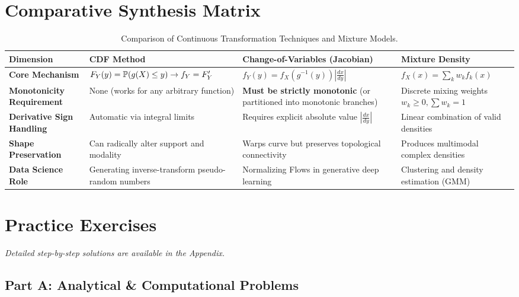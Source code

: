 \section{Comparative Synthesis Matrix}

\begin{table}[htbp]
\centering
\small
\begin{tabular}{p{3.2cm}p{3.8cm}p{3.8cm}p{3.5cm}}
\toprule
\textbf{Dimension} & \textbf{CDF Method} & \textbf{Change-of-Variables (Jacobian)} & \textbf{Mixture Density} \\
\midrule
\textbf{Core Mechanism} & $F_Y(y) = \P(g(X) \le y) \to f_Y = F_Y'$ & $f_Y(y) = f_X(g^{-1}(y)) \left|\frac{dx}{dy}\right|$ & $f_X(x) = \sum_k w_k f_k(x)$ \\
\addlinespace
\textbf{Monotonicity Requirement} & None (works for any arbitrary function) & \textbf{Must be strictly monotonic} (or partitioned into monotonic branches) & Discrete mixing weights $w_k \ge 0, \sum w_k = 1$ \\
\addlinespace
\textbf{Derivative Sign Handling} & Automatic via integral limits & Requires explicit absolute value $\left|\frac{dx}{dy}\right|$ & Linear combination of valid densities \\
\addlinespace
\textbf{Shape Preservation} & Can radically alter support and modality & Warps curve but preserves topological connectivity & Produces multimodal complex densities \\
\addlinespace
\textbf{Data Science Role} & Generating inverse-transform pseudo-random numbers & Normalizing Flows in generative deep learning & Clustering and density estimation (GMM) \\
\bottomrule
\end{tabular}
\caption{Comparison of Continuous Transformation Techniques and Mixture Models.}
\end{table}

\newpage
\section{Practice Exercises}
\textit{Detailed step-by-step solutions are available in the Appendix.}

\subsection*{Part A: Analytical \& Computational Problems}

